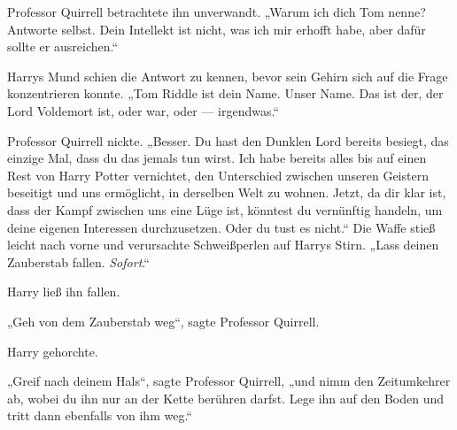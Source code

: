 Professor Quirrell betrachtete ihn unverwandt.
„Warum ich dich Tom nenne? Antworte selbst. Dein Intellekt ist nicht, was ich mir erhofft habe, aber dafür sollte er ausreichen.“

Harrys Mund schien die Antwort zu kennen, bevor sein Gehirn sich auf die Frage konzentrieren konnte.
„Tom Riddle ist dein Name. Unser Name. Das ist der, der Lord Voldemort ist, oder war, oder — irgendwas.“

Professor Quirrell nickte.
„Besser. Du hast den Dunklen Lord bereits besiegt, das einzige Mal, dass du das jemals tun wirst. Ich habe bereits alles bis auf einen Rest von Harry Potter vernichtet, den Unterschied zwischen unseren Geistern beseitigt und uns ermöglicht, in derselben Welt zu wohnen. Jetzt, da dir klar ist, dass der Kampf zwischen uns eine Lüge ist, könntest du vernünftig handeln, um deine eigenen Interessen durchzusetzen. Oder du tust es nicht.“ Die Waffe stieß leicht nach vorne und verursachte Schweißperlen auf Harrys Stirn.
„Lass deinen Zauberstab fallen. \emph{Sofort}.“

Harry ließ ihn fallen.

„Geh von dem Zauberstab weg“, sagte Professor Quirrell.

Harry gehorchte.

„Greif nach deinem Hals“, sagte Professor Quirrell, „und nimm den Zeitumkehrer ab, wobei du ihn nur an der Kette berühren darfst. Lege ihn auf den Boden und tritt dann ebenfalls von ihm weg.“

